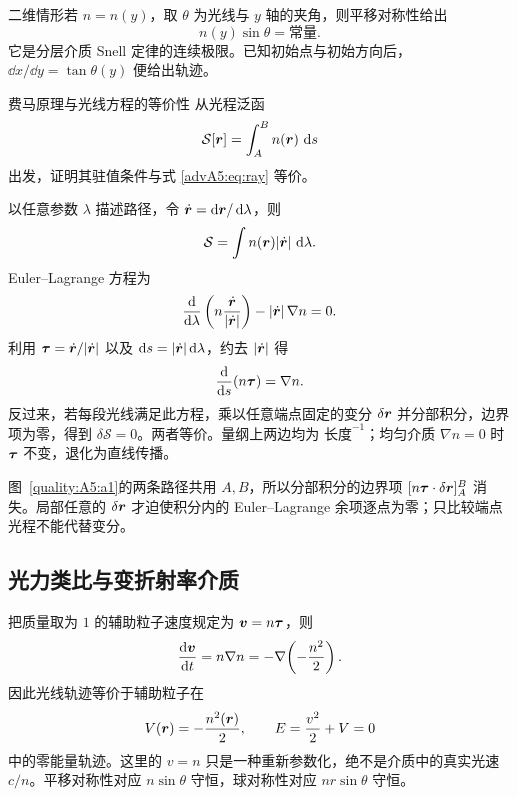 二维情形若 $n=n(y)$，取 $\theta$ 为光线与 $y$ 轴的夹角，则平移对称性给出
\[
 \boxed{n(y)\sin\theta=\text{常量}}.
\]
它是分层介质 Snell 定律的连续极限。已知初始点与初始方向后，
$\dd x/\dd y=\tan\theta(y)$ 便给出轨迹。

\begin{advexamplebox}{费马原理与光线方程的等价性}\label{advA5:ex:fermat-ray}
从光程泛函
\[
 \mathcal S[\bm{r}]=\int_A^B n(\bm{r})\,\mathop{}\!\mathrm d s
\]
出发，证明其驻值条件与式 \eqref{advA5:eq:ray} 等价。

\end{advexamplebox}
\begin{advsolution}
以任意参数 $\lambda$ 描述路径，令
$\dot{\bm{r}}=\mathop{}\!\mathrm d\bm{r}/\mathop{}\!\mathrm d\lambda$，则
\[
 \mathcal S=\int n(\bm{r})|\dot{\bm{r}}|\,\mathop{}\!\mathrm d\lambda .
\]
Euler--Lagrange 方程为
\[
 \frac{\mathop{}\!\mathrm d}{\mathop{}\!\mathrm d\lambda}
 \left(n\frac{\dot{\bm{r}}}{|\dot{\bm{r}}|}\right)
 -|\dot{\bm{r}}|\,\nabla n=0.
\]
利用 $\bm{\tau}=\dot{\bm{r}}/|\dot{\bm{r}}|$ 以及
$\mathop{}\!\mathrm d s=|\dot{\bm{r}}|\mathop{}\!\mathrm d\lambda$，约去 $|\dot{\bm{r}}|$ 得
\[
 \frac{\mathop{}\!\mathrm d}{\mathop{}\!\mathrm d s}(n\bm{\tau})=\nabla n.
\]
反过来，若每段光线满足此方程，乘以任意端点固定的变分
$\delta\bm{r}$ 并分部积分，边界项为零，得到
$\delta\mathcal S=0$。两者等价。量纲上两边均为
$\text{长度}^{-1}$；均匀介质 $\nabla n=0$ 时
$\bm{\tau}$ 不变，退化为直线传播。


图~\ref{quality:A5:a1}的两条路径共用 $A,B$，所以分部积分的边界项 $[n\bm{\tau}\cdot\delta\bm{r}]_A^B$ 消失。局部任意的 $\delta\bm{r}$ 才迫使积分内的 Euler--Lagrange 余项逐点为零；只比较端点光程不能代替变分。
\end{advsolution}

\subsection{光力类比与变折射率介质}

把质量取为 $1$ 的辅助粒子速度规定为 $\bm{v}=n\bm{\tau}$，则
\[
 \frac{\mathop{}\!\mathrm d\bm{v}}{\mathop{}\!\mathrm d t}=n\nabla n
 =-\nabla\!\left(-\frac{n^2}{2}\right).
\]
因此光线轨迹等价于辅助粒子在
\[
 V(\bm{r})=-\frac{n^2(\bm{r})}2,\qquad
 E=\frac{v^2}2+V=0
\]
中的零能量轨迹。这里的 $v=n$ 只是一种重新参数化，绝不是介质中的真实光速
$c/n$。平移对称性对应 $n\sin\theta$ 守恒，球对称性对应
$nr\sin\theta$ 守恒。

